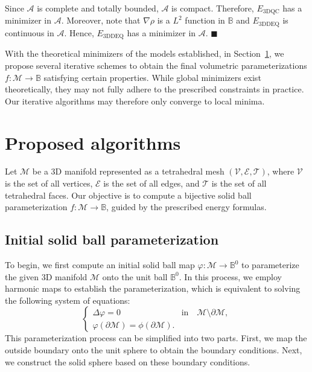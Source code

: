 \documentclass{article}
\begin{document}
Since $\mathcal{A}$ is complete and totally bounded, $\mathcal{A}$ is compact. Therefore, $E_{\text{3DQC}}$ has a minimizer in $\mathcal{A}$. Moreover, note that $\nabla \rho$ is a $L^2$ function in $\mathbb B$ and $E_{\text{3DDEQ}}$ is continuous in $\mathcal{A}$. Hence, $E_{\text{3DDEQ}}$ has a minimizer in $\mathcal{A}$.
\hfill $\blacksquare$ 

With the theoretical minimizers of the models established, in Section~\ref{sec:main}, we propose several iterative schemes to obtain the final volumetric parameterizations $f:\mathcal{M} \rightarrow \mathbb B$ satisfying certain properties. While global minimizers exist theoretically, they may not fully adhere to the prescribed constraints in practice. Our iterative algorithms may therefore only converge to local minima.
\section{Proposed algorithms}\label{sec:main}
Let $\mathcal{M}$ be a 3D manifold represented as a tetrahedral mesh $\left(\mathcal{V},\mathcal{E},\mathcal{T}  \right)$, where $\mathcal{V}$
is the set of all vertices, $\mathcal{E}$ is the set of all edges, and $\mathcal{T}$ is the set of all tetrahedral faces. Our objective is to compute a bijective solid ball parameterization $f: \mathcal{M} \rightarrow \mathbb B$, guided by the prescribed energy formulas.

\subsection{Initial solid ball parameterization}\label{sec:initial_ball}
To begin, we first compute an initial solid ball map $\varphi:\mathcal{M} \rightarrow \mathbb B^0$ to parameterize the given 3D manifold $\mathcal{M}$ onto the unit ball $\mathbb B^0$. In this process, we employ harmonic maps to establish the parameterization, which is equivalent to solving the following system of equations:
\begin{equation}\label{eqt:Laplace}
    \left \{
    \begin{array}{ll}
    \Delta \varphi = 0     & \text{in} \quad \mathcal{M} \setminus \partial \mathcal{M}, \\
    \varphi \left(\partial \mathcal{M} \right) = \phi \left(\partial \mathcal{M} \right).    & 
    \end{array}    
    \right.
\end{equation}
This parameterization process can be simplified into two parts. First, we map the outside boundary onto the unit sphere to obtain the boundary conditions. Next, we construct the solid sphere based on these boundary conditions.
\end{document}

